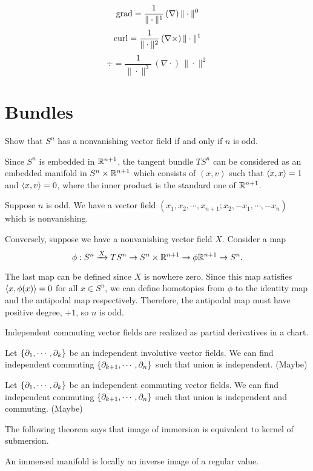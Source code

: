 \documentclass[a4paper]{article}
\begin{document}
\bigskip

\[\operatorname{grad}=\frac1{\|\cdot\|^1}\,(\nabla)\,\|\cdot\|^0\]
\[\operatorname{curl}=\frac1{\|\cdot\|^2}\,(\nabla\times)\,\|\cdot\|^1\]
\[\div=\frac1{\|\cdot\|^3}\,(\nabla\cdot)\,\|\cdot\|^2\]




\section{Bundles}
Show that $S^n$ has a nonvanishing vector field if and only if $n$ is odd.
\begin{sol}
Since $S^n$ is embedded in $\mathbb{R}^{n+1}$, the tangent bundle $TS^n$ can be considered as an embedded manifold in $S^n\times\mathbb{R}^{n+1}$ which consists of $(x,v)$ such that $\langle x,x\rangle=1$ and $\langle x,v\rangle=0$, where the inner product is the standard one of $\mathbb{R}^{n+1}$.

Suppose $n$ is odd.
We have a vector field
$(x_1,x_2,\cdots,x_{n+1};x_2,-x_1,\cdots,-x_n)$
which is nonvanishing.

Conversely, suppose we have a nonvanishing vector field $X$.
Consider a map
\[\phi:S^n\xrightarrow{X}TS^n\to S^n\times\mathbb{R}^{n+1}\to{\phi}\mathbb{R}^{n+1}\to S^n.\]

The last map can be defined since $X$ is nowhere zero. Since this map satisfies $\langle x,\phi(x)\rangle=0$ for all $x\in S^n$, we can define homotopies from $\phi$ to the identity map and the antipodal map respectively. Therefore, the antipodal map must have positive degree, $+1$, so $n$ is odd.
\end{sol}


\begin{prop}
Independent commuting vector fields are realized as partial derivatives in a chart.
\end{prop}

\begin{prop}
Let $\{\pd_1,\cdots,\pd_k\}$ be an independent involutive vector fields.
We can find independent commuting $\{\pd_{k+1},\cdots,\pd_n\}$ such that union is independent.
(Maybe)
\end{prop}
\begin{prop}
Let $\{\pd_1,\cdots,\pd_k\}$ be an independent commuting vector fields.
We can find independent commuting $\{\pd_{k+1},\cdots,\pd_n\}$ such that union is independent and commuting.
(Maybe)
\end{prop}

\bigskip



The following theorem says that image of immersion is equivalent to kernel of submersion.
\begin{prop}
An immersed manifold is locally an inverse image of a regular value.
\end{prop}
\end{document}
